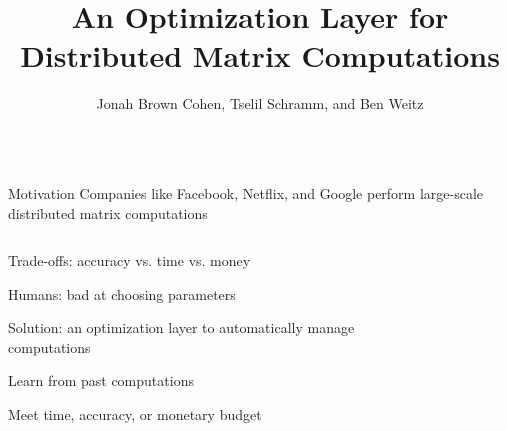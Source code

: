 \documentclass[final]{beamer}
\title[]{{\veryHuge An Optimization Layer for Distributed Matrix Computations }}
\author[]{{\Large Jonah Brown Cohen, Tselil Schramm, and Ben Weitz}}
\date{}
\begin{document}
{\large
  \begin{frame}{} 

\maketitle

\vspace{-1cm}
\begin{center}
\begin{columns}[t]
\begin{column}{0.32\textwidth}


    \begin{block}{\huge Motivation}
\vspace{.5cm}
{\Large Companies like Facebook, Netflix, and Google perform large-scale distributed matrix computations}
\begin{columns}[t]
\begin{column}{0.45\textwidth}
\begin{itemize} {\Large
\item Trade-offs: accuracy vs. time vs. money
\item Humans: bad at choosing parameters
\item Solution: an optimization layer to automatically manage computations
\item Learn from past computations
\item Meet time, accuracy, or monetary budget
}
\end{itemize}
\end{column}
\begin{column}{0.45\textwidth}
\begin{center}
\begin{figure}
\end{figure}
\end{center}
\end{column}
\end{columns}
\end{block}
\end{column}
\end{columns}
\end{center}
\end{frame}}
\end{document}
